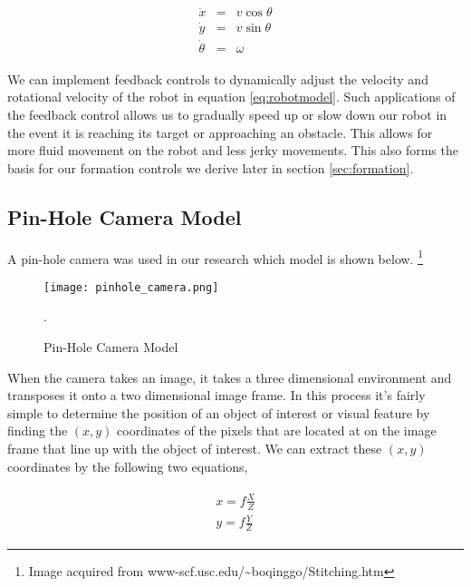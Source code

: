 \documentclass[12pt]{article}
\begin{document}
\begin{eqnarray}
	\begin{array}{lll}
		\dot{x}& =& v\cos\theta \\
		\dot{y} &=& v\sin\theta \\
		\dot\theta &=& \omega 
	\end{array} \label{eq:robotmodel}
\end{eqnarray}

We can implement feedback controls to dynamically adjust the velocity and rotational velocity of the robot in equation \ref{eq:robotmodel}. Such applications of the feedback control allows us to gradually speed up or slow down our robot in the event it is reaching its target or approaching an obstacle. This allows for more fluid movement on the robot and less jerky movements. This also forms the basis for our formation controls we derive later in section \ref{sec:formation}.

\subsection{Pin-Hole Camera Model} \label{sec:cameramodel}

A pin-hole camera was used in our research which model is shown below.  \footnote{Image acquired from www-scf.usc.edu/\textasciitilde boqinggo/Stitching.htm}

\begin{figure}[htp!]
	\begin{center}
		\texttt{[image: pinhole\_camera.png]}
		\caption{Pin-Hole Camera Model}. \label{fig.pinhole}
	\end{center}
\end{figure} 


When the camera takes an image, it takes a three dimensional environment and transposes it onto a two dimensional image frame. In this process it's fairly simple to determine the position of an object of interest or visual feature by finding the $(x,y)$ coordinates of the pixels that are located at on the image frame that line up with the object of interest. We can extract these $(x,y)$ coordinates by the following two equations,

\begin{eqnarray}
	\begin{array}{ll}
		x = f\frac{X}{Z} \\
		y = f\frac{Y}{Z}
	\end{array} \label{eq:pin-hole}
\end{eqnarray}
\end{document}
